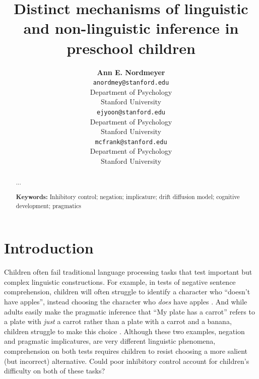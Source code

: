\documentclass[10pt,letterpaper]{article}
\title{Distinct mechanisms of linguistic and non-linguistic inference in preschool children}
\author{{\large \bf Ann E. Nordmeyer} \\
  \texttt{anordmey@stanford.edu} \\
  Department of Psychology \\
  Stanford University
  \And {\large \bf Erica J. Yoon} \\
  \texttt{ejyoon@stanford.edu} \\
  Department of Psychology \\
  Stanford University
  \And {\large \bf Michael C. Frank} \\
  \texttt{mcfrank@stanford.edu} \\
  Department of Psychology \\
  Stanford University}
\newcommand{\ejy}[1]{\textcolor{Blue}{[ejy: #1]}}
\newcommand{\aen}[1]{\textcolor{DarkOrange}{[aen: #1]}}
\begin{document}
\maketitle


\begin{abstract}

...

\textbf{Keywords:} 
Inhibitory control; negation; implicature; drift diffusion model; cognitive development; pragmatics

\end{abstract}


\section{Introduction}

%
%

Children often fail traditional language processing tasks that test important but complex linguistic constructions.  For example, in tests of negative sentence comprehension, children will often struggle to identify a character who ``doesn't have apples'', instead choosing the character who \emph{does} have apples \cite{nordmeyer2014b}.  And while adults easily make the pragmatic inference that ``My plate has a carrot'' refers to a plate with \emph{just} a carrot rather than a plate with a carrot and a banana, children struggle to make this choice \cite{yoonchildren}.   Although these two examples, negation and pragmatic implicatures, are very different linguistic phenomena, comprehension on both tests requires children to resist choosing a more salient (but incorrect) alternative.  Could poor inhibitory control account for children's difficulty on both of these tasks? 
\end{document}
